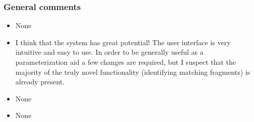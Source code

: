 \subsubsection{General comments}
\begin{itemize}
\item None

\item I think that the system has great potential! The user interface is very intuitive and easy to use. In order to be generally useful as a parameterization aid a few changes are required, but I suspect that the majority of the truly novel functionality (identifying matching fragments) is already present. 

\item None

\item None

\end{itemize}


